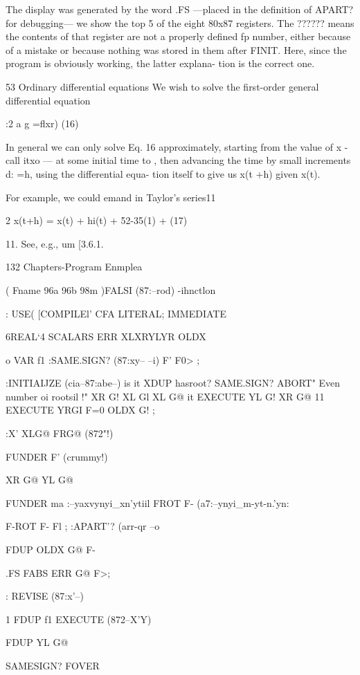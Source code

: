 {The display was generated by the word .FS —placed in the
deﬁnition of APART? for debugging— we show the top 5 of the
eight 80x87 registers. The ?????? means the contents of that
register are not a properly deﬁned fp number, either because of
a mistake or because nothing was stored in them after FINIT.
Here, since the program is obviously working, the latter explana-
tion is the correct one.

53 Ordinary differential equations
We wish to solve the ﬁrst-order general differential equation

:2 a g =ﬂxr) (16)

In general we can only solve Eq. 16 approximately, starting from
the value of x - call itxo — at some initial time to , then advancing
the time by small increments d: =h, using the differential equa-
tion itself to give us x(t +h) given x(t).

For example, we could emand in Taylor’s series11

2
x(t+h) = x(t) + hi(t) + 52-35(1) + (17)

 

11. See, e.g., um [3.6.1.

132 Chapters-Program Enmplea

\USE( Fname 96a 96b 98m )FALSI
(87:--rod)
\meeisthemmeoiaFORTl-ihnctlon

\iunctionnotation
: USE( [COMPILEl' CFA LITERAL;
IMMEDIATE

6REAL‘4 SCALARS ERR XLXRYLYR OLDX

o VAR f1 \apiacetostorecia
:SAME.SIGN? (87:xy-- --i)
F' F0> ;

:INITIAIJZE (cia--87:abe--)
is it \storecia
XDUP \interval hasroot?
SAME.SIGN?
ABORT" Even number oi rootsil !"
XR G! XL Gl
XL G@ it EXECUTE YL G!
XR G@ 11 EXECUTE YRGI
F=0 OLDX G! ;

 

:X' XLG@ FRG@ (872"!)

FUNDER F' (crummy!)

XR G@ YL G@

FUNDER ma :--yaxvynyi_xn'ytiil
FROT F- (a7:--ynyi_m-yt-n.'yn:

F-ROT F- Fl ;
:APART'? (arr-qr --o

FDUP OLDX G@ F-

.FS FABS ERR G@ F>;

: REVISE (87:x'--)

1
FDUP f1 EXECUTE (872--X'Y)

FDUP YL G@

SAMESIGN? FOVER

}
